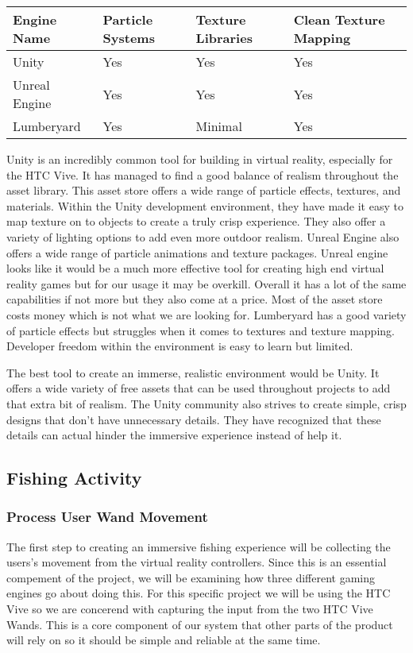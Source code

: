\documentclass[10pt,journal,compsoc,onecolumn, draftclsnofoot]{IEEEtran}
\begin{document}
\vspace{2mm}
\begin{table}[h!]
\centering
  \begin{tabu} to 1.0\textwidth { | X[l] || X[c] | X[c] | X[c] |  }
  \hline
  Engine Name & Particle Systems & Texture Libraries & Clean Texture Mapping\\
  \hline
  Unity  & Yes & Yes & Yes\\
  Unreal Engine & Yes & Yes & Yes\\
  Lumberyard & Yes & Minimal & Yes \\
  \hline
  \end{tabu}
\end{table}
\vspace{2mm}

Unity is an incredibly common tool for building in virtual reality, especially for the HTC Vive.
It has managed to find a good balance of realism throughout the asset library.
This asset store offers a wide range of particle effects, textures, and materials.
Within the Unity development environment, they have made it easy to map texture on to objects to create a truly crisp experience.
They also offer a variety of lighting options to add even more outdoor realism.
Unreal Engine also offers a wide range of particle animations and texture packages.
Unreal engine looks like it would be a much more effective tool for creating high end virtual reality games but for our usage it may be overkill.
Overall it has a lot of the same capabilities if not more but they also come at a price.
Most of the asset store costs money which is not what we are looking for.
Lumberyard has a good variety of particle effects but struggles when it comes to textures and texture mapping.
Developer freedom within the environment is easy to learn but limited.

The best tool to create an immerse, realistic environment would be Unity.
It offers a wide variety of free assets that can be used throughout projects to add that extra bit of realism.
The Unity community also strives to create simple, crisp designs that don’t have unnecessary details.
They have recognized that these details can actual hinder the immersive experience instead of help it.
\vspace{2mm
}

\subsection{Fishing Activity}
\subsubsection{Process User Wand Movement}
The first step to creating an immersive fishing experience will be collecting the users's movement from the virtual reality controllers.
Since this is an essential compement of the project, we will be examining how three different gaming engines go about doing this.
For this specific project we will be using the HTC Vive so we are concerend with capturing the input from the two HTC Vive Wands.
This is a core component of our system that other parts of the product will rely on so it should be simple and reliable at the same time.
\end{document}
